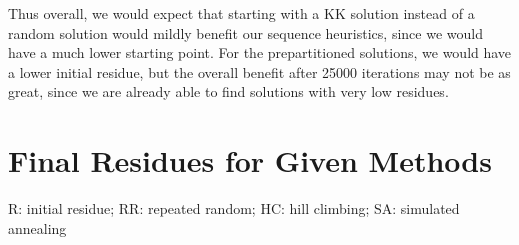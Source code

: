 \documentclass[12pt]{article}
\begin{document}
Thus overall, we would expect that starting with a KK solution instead of a random solution would mildly benefit our sequence heuristics, since we would have a much lower starting point. For the prepartitioned solutions, we would have a lower initial residue, but the overall benefit after 25000 iterations may not be as great, since we are already able to find solutions with very low residues. 



\pagebreak

\appendix
\section{Final Residues for Given Methods}
R: initial residue; RR: repeated random; HC: hill climbing; SA: simulated annealing \\\\
\end{document}
